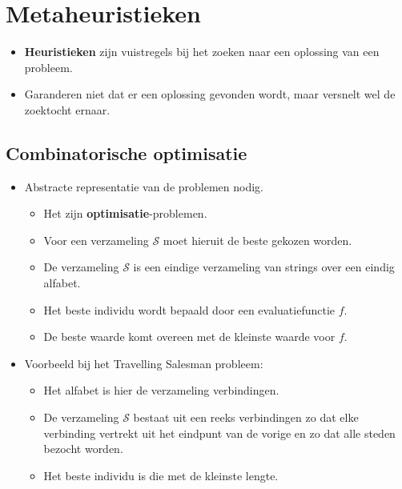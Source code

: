 \chapter{Metaheuristieken}
\begin{itemize}
    \item \textbf{Heuristieken} zijn vuistregels bij het zoeken naar een oplossing van een probleem.
    \item Garanderen niet dat er een oplossing gevonden wordt, maar versnelt wel de zoektocht ernaar.
\end{itemize}

\section{Combinatorische optimisatie}
\begin{itemize}
    \item Abstracte representatie van de problemen nodig. 
    \begin{itemize}
        \item Het zijn \textbf{optimisatie}-problemen.
        \item Voor een verzameling $\mathcal{S}$ moet hieruit de beste gekozen worden.
        \item De verzameling $\mathcal{S}$ is een eindige verzameling van strings over een eindig alfabet.
        \item Het beste individu wordt bepaald door een evaluatiefunctie $f$.
        \item De beste waarde komt overeen met de kleinste waarde voor $f$.
    \end{itemize}
    \item Voorbeeld bij het Travelling Salesman probleem:
    \begin{itemize}
        \item Het alfabet is hier de verzameling verbindingen.
        \item De verzameling $\mathcal{S}$ bestaat uit een reeks verbindingen zo dat elke verbinding vertrekt uit het eindpunt van de vorige en zo dat alle steden bezocht worden.
        \item Het beste individu is die met de kleinste lengte.
    \end{itemize}


\end{itemize}
